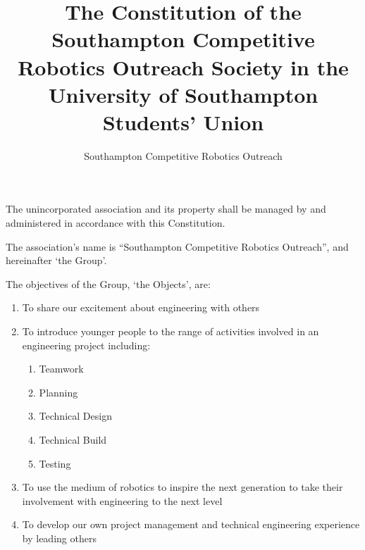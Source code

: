 \documentclass[12pt]{constitution}
\begin{document}

\title{The Constitution of the Southampton Competitive Robotics Outreach Society in the University of Southampton Students' Union}
\author{Southampton Competitive Robotics Outreach}
\maketitle



The unincorporated association and its property shall be managed by and administered in accordance with this Constitution.



The association's name is ``Southampton Competitive Robotics Outreach'', and hereinafter `the Group'.



The objectives of the Group, `the Objects', are:

\begin{enumerate}
    \item To share our excitement about engineering with others
    \item To introduce younger people to the range of activities involved in an engineering project including:
    \begin{enumerate}
        \item Teamwork
        \item Planning
        \item Technical Design 
        \item Technical Build
        \item Testing
    \end{enumerate}
    \item To use the medium of robotics to inspire the next generation to take their involvement with engineering to the next level
    \item To develop our own project management and technical engineering experience by leading others
\end{enumerate}


\end{document}
